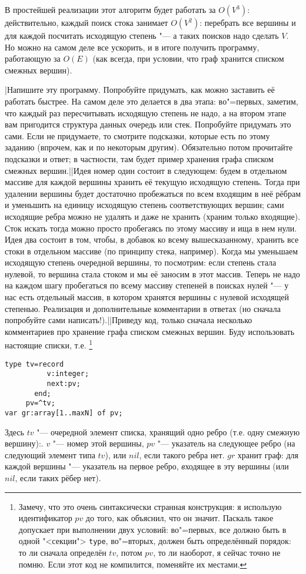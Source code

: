 В простейшей реализации этот алгоритм будет работать за $O(V^3)$: действительно, каждый поиск стока 
занимает $O(V^2)$: перебрать все вершины и для каждой посчитать исходящую степень "--- а таких 
поисков надо сделать $V$. Но можно на самом деле все ускорить, и в итоге получить программу, 
работающую за $O(E)$ (как всегда, при условии, что граф хранится списком смежных вершин).

\task|Напишите эту программу. Попробуйте придумать, как можно заставить её работать быстрее. На 
самом деле это делается в два этапа: во"=первых, заметим, что каждый раз пересчитывать исходящую 
степень не надо, а на втором этапе вам пригодится структура данных очередь или стек. Попробуйте придумать 
это сами. Если не придумаете, то смотрите подсказки, которые есть по этому заданию (впрочем, как и 
по некоторым другим). Обязательно потом прочитайте подсказки и ответ; в частности, там будет пример
хранения графа списком смежных вершин.||Идея номер один состоит в следующем: будем в отдельном массиве для каждой вершины хранить 
её текущую исходящую степень. Тогда при удалении вершины будет достаточно пробежаться по всем входящим
в неё рёбрам и уменьшить на единицу исходящую степень соответствующих вершин; сами исходящие ребра можно не
удалять и даже не хранить (храним только входящие). Сток искать тогда можно просто пробегаясь по этому массиву и ища 
в нем нули.
Идея два состоит в том, чтобы, в добавок ко всему вышесказанному, хранить все стоки в отдельном массиве 
(по принципу стека, например). Когда
мы уменьшаем исходящую степень очередной вершины, то посмотрим: если степень стала нулевой, то вершина стала стоком
и мы её заносим в этот массив. Теперь не надо на каждом шагу пробегаться по всему массиву степеней в поисках нулей
"--- у нас есть отдельный массив, в котором хранятся вершины с нулевой исходящей степенью. Реализация и дополнительные комментарии 
в ответах (но сначала попробуйте сами написать!).||Приведу код, только сначала несколько комментариев про хранение графа списком смежных
вершин. Буду использовать настоящие списки, т.е.%
\footnote{Замечу, что это очень синтаксически странная конструкция: я использую идентификатор $pv$ до того,
как объяснил, что он значит. Паскаль такое допускает при выполнении двух условий: во"=первых, все должно быть в одной 
"<секции"> \texttt{type}, во"=вторых, должен быть определённый порядок: то ли сначала определён $tv$, потом $pv$,
то ли наоборот, я сейчас точно не помню. Если этот код не компилится, поменяйте их местами.}
\begin{codesample}\begin{verbatim}
type tv=record
          v:integer;
          next:pv;
       end;
     pv=^tv;
var gr:array[1..maxN] of pv;
\end{verbatim}
\end{codesample}
Здесь $tv$ "--- очередной элемент списка, хранящий одно ребро (т.е. одну смежную вершину):. $v$ "---
номер этой вершины, $pv$ "--- указатель на следующее ребро (на следующий элемент типа $tv$), или $nil$,
если такого ребра нет.
$gr$ хранит граф: для каждой вершины "--- указатель на первое ребро, \textit{в}ходящее в эту вершины (или $nil$,
если таких рёбер нет).

